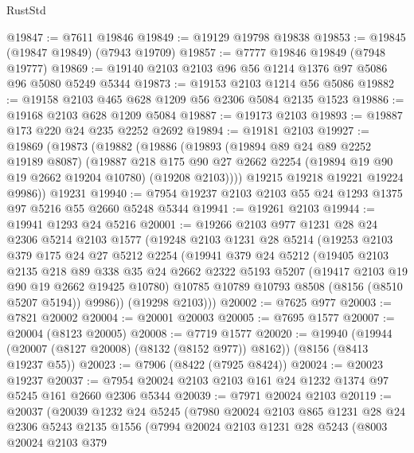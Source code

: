 \begin{lexlean}{RustStd}
\begin{coremodule}
@19847 := @7611 @19846
@19849 := @19129 @19798 @19838
@19853 := @19845 (@19847 @19849) (@7943 @19709)
@19857 := @7777 @19846 @19849 (@7948 @19777)
@19869 := @19140 @2103 @2103 @96 @56 @1214 @1376 @97 @5086 @96 @5080 @5249 @5344
@19873 := @19153 @2103 @1214 @56 @5086
@19882 := @19158 @2103 @465 @628 @1209 @56 @2306 @5084 @2135 @1523
@19886 := @19168 @2103 @628 @1209 @5084
@19887 := @19173 @2103
@19893 := @19887 @173 @220 @24 @235 @2252 @2692
@19894 := @19181 @2103
@19927 := @19869
    (@19873
      (@19882
        (@19886
          (@19893
            (@19894 @89 @24 @89 @2252 @19189 @8087)
            (@19887
              @218
              @175
              @90
              @27
              @2662
              @2254
              (@19894 @19 @90 @19 @2662 @19204 @10780)
              (@19208 @2103))))
        @19215
        @19218
        @19221
        @19224
        @9986))
    @19231
@19940 := @7954 @19237 @2103 @2103 @55 @24 @1293 @1375 @97 @5216 @55 @2660 @5248 @5344
@19941 := @19261 @2103
@19944 := @19941 @1293 @24 @5216
@20001 := @19266
    @2103
    @977
    @1231
    @28
    @24
    @2306
    @5214
    @2103
    @1577
    (@19248
      @2103
      @1231
      @28
      @5214
      (@19253
        @2103
        @379
        @175
        @24
        @27
        @5212
        @2254
        (@19941
          @379
          @24
          @5212
          (@19405
            @2103
            @2135
            @218
            @89
            @338
            @35
            @24
            @2662
            @2322
            @5193
            @5207
            (@19417 @2103 @19 @90 @19 @2662 @19425 @10780)
            @10785
            @10789
            @10793
            @8508
            (@8156 (@8510 @5207 @5194))
            @9986))
        (@19298 @2103)))
@20002 := @7625 @977
@20003 := @7821 @20002
@20004 := @20001 @20003
@20005 := @7695 @1577
@20007 := @20004 (@8123 @20005)
@20008 := @7719 @1577
@20020 := @19940
    (@19944 (@20007 (@8127 @20008) (@8132 (@8152 @977)) @8162))
    (@8156 (@8413 @19237 @55))
@20023 := @7906 (@8422 (@7925 @8424))
@20024 := @20023 @19237
@20037 := @7954 @20024 @2103 @2103 @161 @24 @1232 @1374 @97 @5245 @161 @2660 @2306 @5344
@20039 := @7971 @20024 @2103
@20119 := @20037
    (@20039
      @1232
      @24
      @5245
      (@7980
        @20024
        @2103
        @865
        @1231
        @28
        @24
        @2306
        @5243
        @2135
        @1556
        (@7994
          @20024
          @2103
          @1231
          @28
          @5243
          (@8003
            @20024
            @2103
            @379

\end{coremodule}
\end{lexlean}

